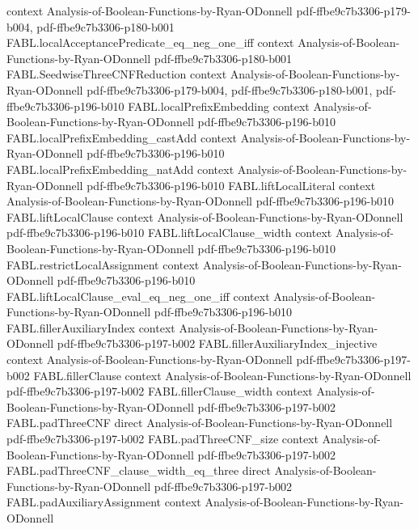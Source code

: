 \begin{theorem}
  {context}
  {Analysis-of-Boolean-Functions-by-Ryan-ODonnell}
  {pdf-ffbe9c7b3306-p179-b004,
    pdf-ffbe9c7b3306-p180-b001}
\proofstep
  {FABL.localAcceptancePredicate_eq_neg_one_iff}
  {context}
  {Analysis-of-Boolean-Functions-by-Ryan-ODonnell}
  {pdf-ffbe9c7b3306-p180-b001}
\proofstep
  {FABL.SeedwiseThreeCNFReduction}
  {context}
  {Analysis-of-Boolean-Functions-by-Ryan-ODonnell}
  {pdf-ffbe9c7b3306-p179-b004,
    pdf-ffbe9c7b3306-p180-b001,
    pdf-ffbe9c7b3306-p196-b010}
\proofstep
  {FABL.localPrefixEmbedding}
  {context}
  {Analysis-of-Boolean-Functions-by-Ryan-ODonnell}
  {pdf-ffbe9c7b3306-p196-b010}
\proofstep
  {FABL.localPrefixEmbedding_castAdd}
  {context}
  {Analysis-of-Boolean-Functions-by-Ryan-ODonnell}
  {pdf-ffbe9c7b3306-p196-b010}
\proofstep
  {FABL.localPrefixEmbedding_natAdd}
  {context}
  {Analysis-of-Boolean-Functions-by-Ryan-ODonnell}
  {pdf-ffbe9c7b3306-p196-b010}
\proofstep
  {FABL.liftLocalLiteral}
  {context}
  {Analysis-of-Boolean-Functions-by-Ryan-ODonnell}
  {pdf-ffbe9c7b3306-p196-b010}
\proofstep
  {FABL.liftLocalClause}
  {context}
  {Analysis-of-Boolean-Functions-by-Ryan-ODonnell}
  {pdf-ffbe9c7b3306-p196-b010}
\proofstep
  {FABL.liftLocalClause_width}
  {context}
  {Analysis-of-Boolean-Functions-by-Ryan-ODonnell}
  {pdf-ffbe9c7b3306-p196-b010}
\proofstep
  {FABL.restrictLocalAssignment}
  {context}
  {Analysis-of-Boolean-Functions-by-Ryan-ODonnell}
  {pdf-ffbe9c7b3306-p196-b010}
\proofstep
  {FABL.liftLocalClause_eval_eq_neg_one_iff}
  {context}
  {Analysis-of-Boolean-Functions-by-Ryan-ODonnell}
  {pdf-ffbe9c7b3306-p196-b010}
\proofstep
  {FABL.fillerAuxiliaryIndex}
  {context}
  {Analysis-of-Boolean-Functions-by-Ryan-ODonnell}
  {pdf-ffbe9c7b3306-p197-b002}
\proofstep
  {FABL.fillerAuxiliaryIndex_injective}
  {context}
  {Analysis-of-Boolean-Functions-by-Ryan-ODonnell}
  {pdf-ffbe9c7b3306-p197-b002}
\proofstep
  {FABL.fillerClause}
  {context}
  {Analysis-of-Boolean-Functions-by-Ryan-ODonnell}
  {pdf-ffbe9c7b3306-p197-b002}
\proofstep
  {FABL.fillerClause_width}
  {context}
  {Analysis-of-Boolean-Functions-by-Ryan-ODonnell}
  {pdf-ffbe9c7b3306-p197-b002}
\proofstep
  {FABL.padThreeCNF}
  {direct}
  {Analysis-of-Boolean-Functions-by-Ryan-ODonnell}
  {pdf-ffbe9c7b3306-p197-b002}
\proofstep
  {FABL.padThreeCNF_size}
  {context}
  {Analysis-of-Boolean-Functions-by-Ryan-ODonnell}
  {pdf-ffbe9c7b3306-p197-b002}
\proofstep
  {FABL.padThreeCNF_clause_width_eq_three}
  {direct}
  {Analysis-of-Boolean-Functions-by-Ryan-ODonnell}
  {pdf-ffbe9c7b3306-p197-b002}
\proofstep
  {FABL.padAuxiliaryAssignment}
  {context}
  {Analysis-of-Boolean-Functions-by-Ryan-ODonnell}

\end{theorem}
